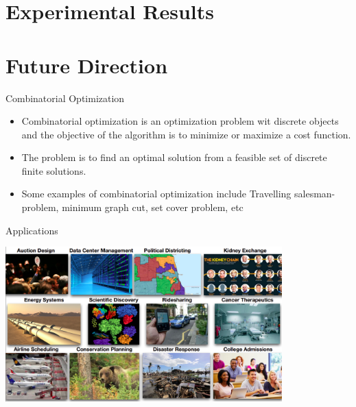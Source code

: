 \documentclass[9pt]{beamer}
\begin{document}
\section{Experimental Results}
\section{Future Direction}
\begin{frame}{Combinatorial Optimization}
\vspace{-40pt}
\begin{itemize}
\item Combinatorial optimization is an optimization
problem wit discrete objects and the objective of the algorithm is to minimize or maximize a cost function.\\
\vspace{20}
\item The problem is to find an optimal solution from a feasible set of discrete finite solutions. \\
\vspace{20}
\item Some examples of
combinatorial optimization include Travelling salesman-problem, minimum graph cut, set cover problem, etc
\end{itemize}
\end{frame}

\begin{frame}{Applications}

\centering
    \includegraphics[width=0.8\textwidth]{images/Applications.png}
\end{frame}
\end{document}
